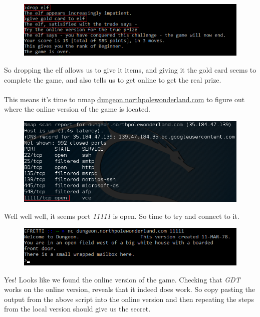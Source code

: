 \documentclass[writeup.tex]{subfiles}
\begin{document}
			\begin{figure}[H]
				\centering
				\includegraphics[scale=1]{"screenshots/pwns/Site 2 - local game over"}
			\end{figure}
			
			So dropping the elf allows us to give it items, and giving it the gold card seems to complete the game, and also tells us to get online to get the real prize.\\
			\\
			This means it's time to nmap \url{dungeon.northpolewonderland.com} to figure out where the online version of the game is located.
			
			\begin{figure}[H]
				\centering
				\includegraphics[scale=1]{"screenshots/pwns/Site 2 - nmap"}
			\end{figure}
			
			Well well well, it seems port \textit{11111} is open. So time to try and connect to it.
			
			\begin{figure}[H]
				\centering
				\includegraphics[scale=1]{"screenshots/pwns/Site 2 - remote"}
			\end{figure}
			
			Yes! Looks like we found the online version of the game. Checking that \textit{GDT} works on the online version, reveals that it indeed does work. So copy pasting the output from the above script into the online version and then repeating the steps from the local version should give us the secret.
			
\end{document}
